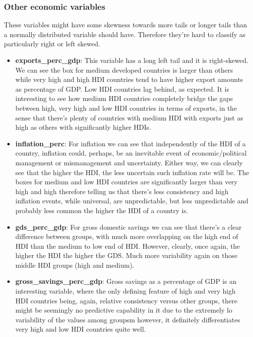 \documentclass[]{article}
\providecommand{\tightlist}{%
  \setlength{\itemsep}{0pt}\setlength{\parskip}{0pt}}
\begin{document}
\hypertarget{other-economic-variables}{%
\subsubsection{Other economic
variables}\label{other-economic-variables}}

These variables might have some skewness towards more tails or longer
tails than a normally distributed variable should have. Therefore
they're hard to classify as particularly right or left skewed.

\begin{itemize}
\tightlist
\item
  \textbf{exports\_perc\_gdp}: This variable has a long left tail and it
  is right-skewed. We can see the box for medium developed countries is
  larger than others while very high and high HDI countries tend to have
  higher export amounts as percentage of GDP. Low HDI countries lag
  behind, as expected. It is interesting to see how medium HDI countries
  completely bridge the gaps between high, very high and low HDI
  countries in terms of exports, in the sense that there's plenty of
  countries with medium HDI with exports just as high as others with
  significantly higher HDIs.
\item
  \textbf{inflation\_perc}: For inflation we can see that independently
  of the HDI of a country, inflation could, perhaps, be an inevitable
  event of economic/political management or mismanagement and
  uncertainty. Either way, we can clearly see that the higher the HDI,
  the less uncertain such inflation rate will be. The boxes for medium
  and low HDI countries are significantly larger than very high and high
  therefore telling us that there's less consistency and high inflation
  events, while universal, are unpredictable, but less unpredictable and
  probably less common the higher the HDI of a country is.
\item
  \textbf{gds\_perc\_gdp}: For gross domestic savings we can see that
  there's a clear difference between groups, with much more overlapping
  on the high end of HDI than the medium to low end of HDI. However,
  clearly, once again, the higher the HDI the higher the GDS. Much more
  variability again on those middle HDI groups (high and medium).
\item
  \textbf{gross\_savings\_perc\_gdp}: Gross savings as a percentage of
  GDP is an interesting variable, where the only defining feature of
  high and very high HDI countries being, again, relative consistency
  versus other groups, there might be seemingly no predictive capability
  in it due to the extremely lo variability of the values among groupsm
  however, it definitely differentiates very high and low HDI countries
  quite well.
\end{itemize}
\end{document}
